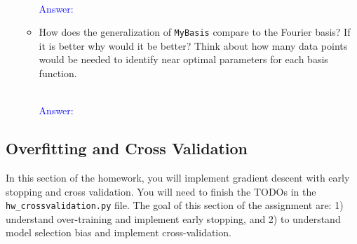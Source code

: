 \documentclass{article}
\begin{document}
\begin{enumerate}
\begin{itemize}
        \textcolor{blue}{\\Answer: }

        \item How does the generalization of \texttt{MyBasis} compare to the Fourier basis? If it is better why would it be better? Think about how many data points would be needed to identify near optimal parameters for each basis function. 

        \textcolor{blue}{\\Answer: }
    \end{itemize}
    
\end{enumerate}




\newpage
\subsection{Overfitting and Cross Validation }
In this section of the homework, you will implement gradient descent with early stopping and cross validation. You will need to finish the TODOs in the \texttt{hw\_crossvalidation.py} file. The goal of this section of the assignment are: 1) understand over-training and implement early stopping, and 2) to understand model selection bias and implement cross-validation. 
\end{document}
